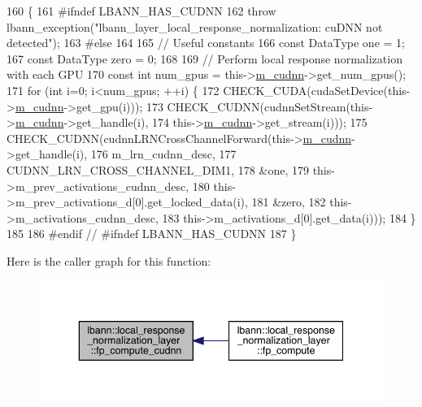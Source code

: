 \begin{DoxyCode}
160                           \{
161 \textcolor{preprocessor}{  #ifndef LBANN\_HAS\_CUDNN}
162     \textcolor{keywordflow}{throw} lbann\_exception(\textcolor{stringliteral}{"lbann\_layer\_local\_response\_normalization: cuDNN not detected"});
163 \textcolor{preprocessor}{  #else}
164 
165     \textcolor{comment}{// Useful constants}
166     \textcolor{keyword}{const} DataType one = 1;
167     \textcolor{keyword}{const} DataType zero = 0;
168 
169     \textcolor{comment}{// Perform local response normalization with each GPU}
170     \textcolor{keyword}{const} \textcolor{keywordtype}{int} num\_gpus = this->\hyperlink{classlbann_1_1Layer_a08dbb94239e3b8c96329786c57c72e21}{m\_cudnn}->get\_num\_gpus();
171     \textcolor{keywordflow}{for} (\textcolor{keywordtype}{int} i=0; i<num\_gpus; ++i) \{
172       CHECK\_CUDA(cudaSetDevice(this->\hyperlink{classlbann_1_1Layer_a08dbb94239e3b8c96329786c57c72e21}{m\_cudnn}->get\_gpu(i)));
173       CHECK\_CUDNN(cudnnSetStream(this->\hyperlink{classlbann_1_1Layer_a08dbb94239e3b8c96329786c57c72e21}{m\_cudnn}->get\_handle(i),
174                                  this->\hyperlink{classlbann_1_1Layer_a08dbb94239e3b8c96329786c57c72e21}{m\_cudnn}->get\_stream(i)));
175       CHECK\_CUDNN(cudnnLRNCrossChannelForward(this->\hyperlink{classlbann_1_1Layer_a08dbb94239e3b8c96329786c57c72e21}{m\_cudnn}->get\_handle(i),
176                                               m\_lrn\_cudnn\_desc,
177                                               CUDNN\_LRN\_CROSS\_CHANNEL\_DIM1,
178                                               &one,
179                                               this->m\_prev\_activations\_cudnn\_desc,
180                                               this->m\_prev\_activations\_d[0].get\_locked\_data(i),
181                                               &zero,
182                                               this->m\_activations\_cudnn\_desc,
183                                               this->m\_activations\_d[0].get\_data(i)));
184     \}
185 
186 \textcolor{preprocessor}{  #endif // #ifndef LBANN\_HAS\_CUDNN}
187   \}
\end{DoxyCode}
Here is the caller graph for this function\+:\nopagebreak
\begin{figure}[H]
\begin{center}
\leavevmode
\includegraphics[width=343pt]{classlbann_1_1local__response__normalization__layer_a715b08cfc4bfed730a066f6d9cedef86_icgraph}
\end{center}
\end{figure}

